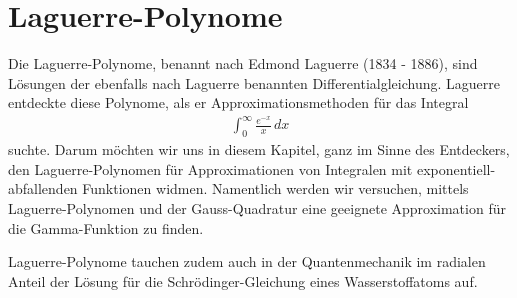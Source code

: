 %
%
%
\chapter{Laguerre-Polynome\label{chapter:laguerre}}
\begin{refsection}

{\parindent0pt Die} Laguerre\--Polynome, 
benannt nach Edmond Laguerre (1834 - 1886),
sind Lösungen der ebenfalls nach Laguerre benannten Differentialgleichung.
Laguerre entdeckte diese Polynome, als er Approximations\-methoden 
für das Integral 
\begin{align*}
\int_0^\infty \frac{e^{-x}}{x} \, dx
\end{align*}
suchte.
Darum möchten wir uns in diesem Kapitel, 
ganz im Sinne des Entdeckers,
den Laguerre-Polynomen für Approximationen von Integralen mit 
exponentiell-abfallenden Funktionen widmen.
Namentlich werden wir versuchen, mittels Laguerre-Polynomen und
der Gauss-Quadratur eine geeignete Approximation für die Gamma-Funktion zu finden.

Laguerre-Polynome tauchen zudem auch in der Quantenmechanik im radialen Anteil 
der Lösung für die Schrödinger-Gleichung eines Wasserstoffatoms auf.





% 
% 

\printbibliography[heading=subbibliography]
\end{refsection}
